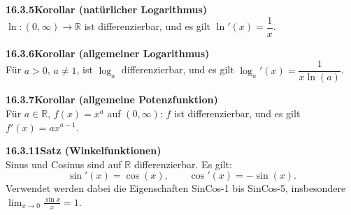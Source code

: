 \documentclass[a4paper,12pt]{article}
\newcommand{\gentry}[3]{%
  \noindent\textbf{#1\quad #2}\nopagebreak\\[0.2em]
  #3\par\smallskip
}
\begin{document}
\gentry{16.3.5}{Korollar (natürlicher Logarithmus)}{%
  $\ln: (0,\infty) \to \mathbb{R}$ ist differenzierbar, und es gilt $\ln'(x) = \dfrac{1}{x}$.
}

\gentry{16.3.6}{Korollar (allgemeiner Logarithmus)}{%
  Für $a > 0$, $a \neq 1$, ist $\log_a$ differenzierbar, und es gilt
  $\log_a'(x) = \dfrac{1}{x \ln(a)}$.
}

\gentry{16.3.7}{Korollar (allgemeine Potenzfunktion)}{%
  Für $a \in \mathbb{R}$, $f(x) = x^a$ auf $(0,\infty)$: $f$ ist differenzierbar,
  und es gilt $f'(x) = a x^{a-1}$.
}

\gentry{16.3.11}{Satz (Winkelfunktionen)}{%
  Sinus und Cosinus sind auf $\mathbb{R}$ differenzierbar. Es gilt:
  \[
    \sin'(x) = \cos(x), \qquad \cos'(x) = -\sin(x).
  \]
  Verwendet werden dabei die Eigenschaften SinCos-1 bis SinCos-5,
  insbesondere $\lim_{x\to 0}\frac{\sin x}{x} = 1$.
}
\end{document}
